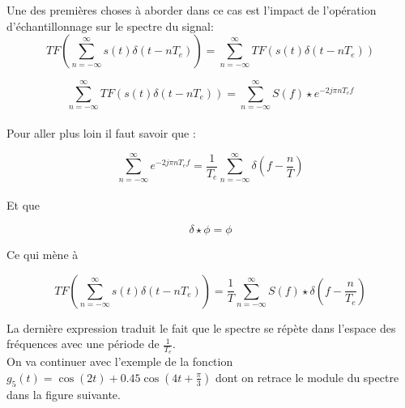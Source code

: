 \documentclass[11pt,a4paper]{article}
\begin{document}
\begin{center}
\end{center}

Une des premières choses à aborder dans ce cas est l'impact de l'opération d'échantillonnage sur le spectre du signal:\\

\[ TF (\sum_{n = -\infty}^{\infty} s(t)\delta(t-nT_e)) = \sum_{n = -\infty}^{\infty} TF(s(t)\delta(t-nT_e) ) \]

\[ \sum_{n = -\infty}^{\infty} TF(s(t)\delta(t-nT_e) ) = \sum_{n = -\infty}^{\infty} S(f) \star e^{- 2j\pi n T_e f} \]\\

Pour aller plus loin il faut savoir que : 

\[ \sum_{n = -\infty}^{\infty} e^{- 2j\pi n T_e f} = \frac{1}{T_e} \sum_{n = -\infty}^{\infty} \delta(f - \frac{n}{T}) \]\\

Et que 

\[\delta \star \phi = \phi \]

Ce qui mène à 

\[ TF (\sum_{n = -\infty}^{\infty} s(t)\delta(t-nT_e)) = \frac{1}{T}\sum_{n = -\infty}^{\infty} S(f) \star \delta(f - \frac{n}{T_e})\]

La dernière expression traduit le fait que le spectre se répète dans l'espace des fréquences avec une période de $\frac{1}{T_e}$.\\

On va continuer avec l'exemple de la fonction $ g_5(t) = \cos(2 t) + 0.45 \cos(4 t + \frac{\pi}{3})$ dont on retrace le module du spectre dans  la figure suivante.
\end{document}
